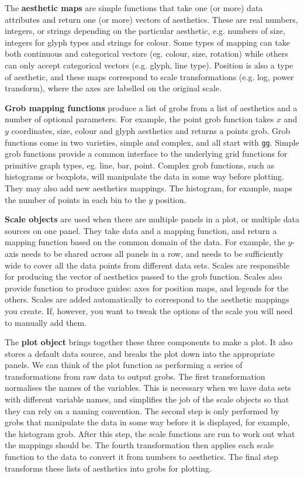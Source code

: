 \documentclass[]{article}
\begin{document}
The \textbf{aesthetic maps} are simple functions that take one (or more) data attributes and return one (or more) vectors of aesthetics.  These are real numbers, integers, or strings depending on the particular aesthetic, e.g. numbers of size, integers for glyph types and strings for colour.  Some types of mapping can take both continuous and categorical vectors (eg. colour, size, rotation) while others can only accept categorical vectors (e.g. glyph, line type).  Position is also a type of aesthetic, and these maps correspond to scale transformations (e.g. log, power transform), where the axes are labelled on the original scale.

\textbf{Grob mapping functions} produce a list of grobs from a list of aesthetics and a number of optional parameters.  For example, the point grob function takes $x$ and $y$ coordinates, size, colour and glyph aesthetics and returns a points grob. Grob functions come in two varieties, simple and complex, and all start with \texttt{gg}.  Simple grob functions provide a common interface to the underlying grid functions for primitive graph types, eg. line, bar, point.  Complex grob functions, such as histograms or boxplots, will manipulate the data in some way before plotting.  They may also add new aesthetics mappings.  The histogram, for example, maps the number of points in each bin to the $y$ position. 

\textbf{Scale objects} are used when there are multiple panels in a plot, or multiple data sources on one panel.  They take data and a mapping function, and return a mapping function based on the common domain of the data.  For example, the $y$-axis needs to be shared across all panels in a row, and needs to be sufficiently wide to cover all the data points from different data sets.  Scales are responsible for producing the vector of aesthetics passed to the grob function.  Scales also provide function to produce guides: axes for position maps, and legends for the others.  Scales are added automatically to correspond to the aesthetic mappings you create.  If, however, you want to tweak the options of the scale you will need to manually add them. 

The \textbf{plot object} brings together these three components to make a plot.  It also stores a default data source, and breaks the plot down into the appropriate panels.  We can think of the plot function as performing a series of transformations from raw data to output grobs.  The first transformation normalises the names of the variables.  This is necessary when we have data sets with different variable names, and simplifies the job of the scale objects so that they can rely on a naming convention.  The second step is only performed by grobs that manipulate the data in some way before it is displayed, for example, the histogram grob.  After this step, the scale functions are run to work out what the mappings should be.  The fourth transformation then applies each scale function to the data to convert it from numbers to aesthetics.  The final step transforms these lists of aesthetics into grobs for plotting.
\end{document}
